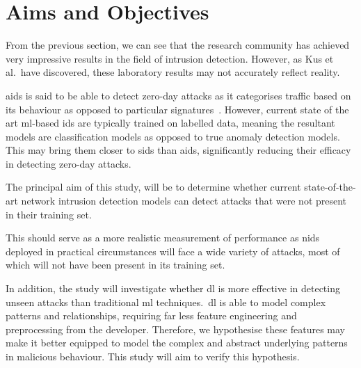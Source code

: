 \chapter{Aims and Objectives}%
\label{chp:aims}

From the previous section, we can see that the research community has achieved
very impressive results in the field of intrusion detection. However, as Kus et
al.\ have discovered, these laboratory results may not accurately reflect
reality.

\gls{aids} is said to be able to detect zero-day attacks as it categorises
traffic based on its behaviour as opposed to particular
signatures~\cite{aids-zero-day}. However, current state of the art
\gls{ml}-based \gls{ids} are typically trained on labelled data, meaning the
resultant models are classification models as opposed to true anomaly detection
models. This may bring them closer to \gls{sids} than \gls{aids}, significantly
reducing their efficacy in detecting zero-day attacks.

The principal aim of this study, will be to determine whether current
state-of-the-art network intrusion detection models can detect attacks that
were not present in their training set.

This should serve as a more realistic measurement of performance as \gls{nids}
deployed in practical circumstances will face a wide variety of attacks, most
of which will not have been present in its training set.

In addition, the study will investigate whether \gls{dl} is more effective in
detecting unseen attacks than traditional \gls{ml} techniques.\ \gls{dl} is
able to model complex patterns and relationships, requiring far less feature
engineering and preprocessing from the developer. Therefore, we hypothesise
these features may make it better equipped to model the complex and abstract
underlying patterns in malicious behaviour. This study will aim to verify this
hypothesis.
